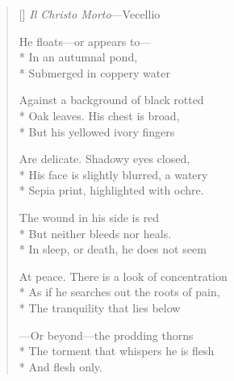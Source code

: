 \label{ch:venezia_scuola}
\settowidth{\versewidth}{At peace. There is a look of concentration}
\begin{verse}[\versewidth]
\textit{Il Christo Morto}---Vecellio

He floats---or appears to---\\*
In an autumnal pond,\\*
Submerged in coppery water

Against a background of black rotted\\*
Oak leaves.   His chest is broad,\\*
But his yellowed ivory fingers

Are delicate.  Shadowy eyes closed,\\*
His face is slightly blurred, a watery\\*
Sepia print, highlighted with ochre.

The wound in his side is red\\*
But neither bleeds nor heals.\\*
In sleep, or death, he does not seem

At peace. There is a look of concentration\\*
As if he searches out the roots of pain,\\*
The tranquility that lies below

---Or beyond---the prodding thorns\\*
The torment that whispers he is flesh\\*
And flesh only.
\end{verse}
